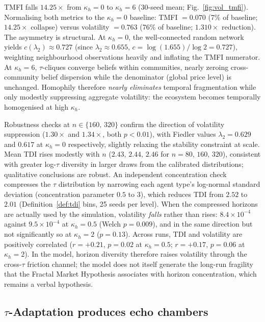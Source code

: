 \documentclass[preprint,12pt,authoryear]{elsarticle}
\begin{document}
TMFI falls $14.25\times$ from $\kappa_h = 0$ to $\kappa_h = 6$
(30-seed mean; Fig.~\ref{fig:vol_tmfi}).
Normalising both metrics to the $\kappa_h = 0$ baseline: TMFI $= 0.070$
(7\% of baseline; $14.25\times$ collapse) versus volatility $= 0.763$
(76\% of baseline; $1.310\times$ reduction).
The asymmetry is structural.
At $\kappa_h = 0$, the well-connected random network yields
$c(\lambda_2) \approx 0.727$ (since $\lambda_2 \approx 0.655$,
$c = \log(1.655)/\log 2 = 0.727$), weighting neighbourhood
observations heavily and inflating the TMFI numerator.
At $\kappa_h = 6$, $\tau$-cliques converge beliefs within communities,
nearly zeroing cross-community belief dispersion while the denominator
(global price level) is unchanged.
Homophily therefore \emph{nearly eliminates} temporal fragmentation while
only modestly suppressing aggregate volatility: the ecosystem becomes
temporally homogenised at high $\kappa_h$.

Robustness checks at $n \in \{160,\,320\}$ confirm the direction of
volatility suppression ($1.30\times$ and $1.34\times$, both $p < 0.01$),
with Fiedler values $\lambda_2 = 0.629$ and $0.617$ at $\kappa_h = 0$
respectively, slightly relaxing the stability constraint at scale.
Mean TDI rises modestly with $n$ ($2.43,\,2.44,\,2.46$ for
$n = 80,\,160,\,320$), consistent with greater log-$\tau$ diversity in
larger draws from the calibrated distributions; qualitative conclusions
are robust.
An independent concentration check compresses the $\tau$ distribution by
narrowing each agent type's log-normal standard deviation (concentration
parameter $0.5$ to $3$), which reduces TDI from $2.52$ to $2.01$ (Definition~\ref{def:tdi} bins, 25 seeds per level).
When the compressed horizons are actually used by the simulation, volatility
\emph{falls} rather than rises: $8.4\times10^{-4}$ against $9.5\times10^{-4}$
at $\kappa_h = 0.5$ (Welch $p = 0.009$), and in the same direction but not
significantly so at $\kappa_h = 2$ ($p = 0.13$).
Across runs, TDI and volatility are positively correlated
($r = +0.21$, $p = 0.02$ at $\kappa_h = 0.5$; $r = +0.17$, $p = 0.06$ at
$\kappa_h = 2$).
In the model, horizon diversity therefore raises volatility through the
cross-$\tau$ friction channel; the model does not itself generate the
long-run fragility that the Fractal Market Hypothesis associates with horizon
concentration, which remains a verbal hypothesis.

\subsection{$\tau$-Adaptation produces echo chambers}
\end{document}
